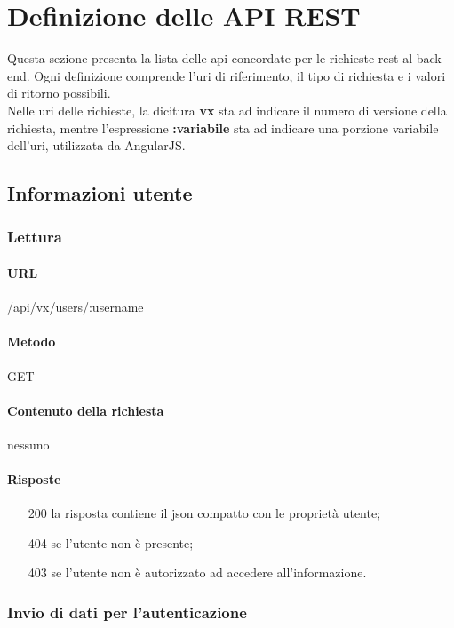 
\section{Definizione delle API REST}
Questa sezione presenta la lista delle \gls{api} concordate per le richieste \gls{rest} al \gls{back-end}. Ogni definizione comprende l'\gls{uri} di riferimento, il tipo di richiesta e i valori di ritorno possibili.\\
Nelle \gls{uri} delle richieste, la dicitura \textbf{vx} sta ad indicare il numero di versione della richiesta, mentre l'espressione \textbf{:variabile} sta ad indicare una porzione variabile dell'\gls{uri}, utilizzata da AngularJS.

\subsection{Informazioni utente}

\subsubsection{Lettura}

\paragraph{URL}
/api/vx/users/:username
\paragraph{Metodo}
GET
\paragraph{Contenuto della richiesta}
nessuno
\paragraph{Risposte}
\begin{itemize}
	\item[200] la risposta contiene il \gls{json} compatto con le proprietà utente;
	\item[404] se l'utente non è presente;
	\item[403] se l'utente non è autorizzato ad accedere all'informazione.
\end{itemize}


\subsubsection{Invio di dati per l'autenticazione}
